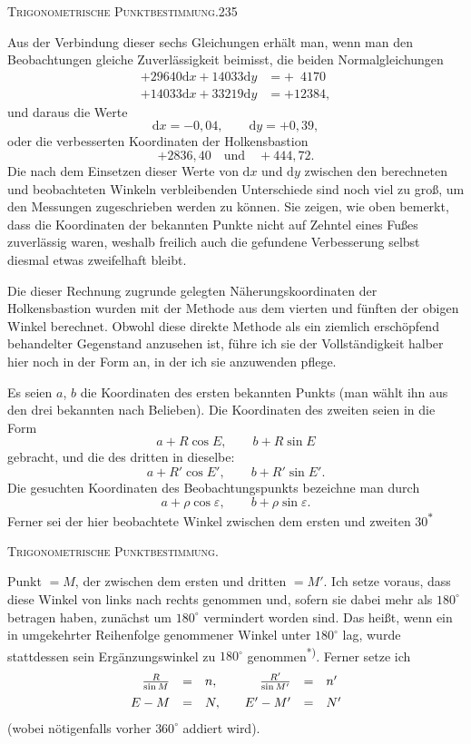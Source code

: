 \clearpage
\noindent\mbox{}\hfill\textsc{Trigonometrische Punktbestimmung.}\hfill235\par\medskip
Aus der Verbindung dieser sechs Gleichungen erhält man, wenn man den Beobachtungen gleiche Zuverlässigkeit beimisst, die beiden Normalgleichungen
\[
\begin{aligned}
+29640\mathrm dx+14033\mathrm dy&=+\phantom04170\\
+14033\mathrm dx+33219\mathrm dy&=+12384,
\end{aligned}
\]
und daraus die Werte
\[
\mathrm dx=-0{,}04,\qquad\mathrm dy=+0{,}39,
\]
oder die verbesserten Koordinaten der Holkensbastion
\[
+2836{,}40\quad\text{und}\quad+444{,}72.
\]
Die nach dem Einsetzen dieser Werte von $\mathrm dx$ und $\mathrm dy$ zwischen den berechneten und beobachteten Winkeln verbleibenden Unterschiede sind noch viel zu groß, um den Messungen zugeschrieben werden zu können. Sie zeigen, wie oben bemerkt, dass die Koordinaten der bekannten Punkte nicht auf Zehntel eines Fußes zuverlässig waren, weshalb freilich auch die gefundene Verbesserung selbst diesmal etwas zweifelhaft bleibt.

Die dieser Rechnung zugrunde gelegten Näherungskoordinaten der Holkensbastion wurden mit der  Methode aus dem vierten und fünften der obigen Winkel berechnet. Obwohl diese direkte Methode als ein ziemlich erschöpfend behandelter Gegenstand anzusehen ist, führe ich sie der Vollständigkeit halber hier noch in der Form an, in der ich sie anzuwenden pflege.

Es seien $a$, $b$ die Koordinaten des ersten bekannten Punkts (man wählt ihn aus den drei bekannten nach Belieben). Die Koordinaten des zweiten seien in die Form
\[
a+R\cos E,\qquad b+R\sin E
\]
gebracht, und die des dritten in dieselbe:
\[
a+R'\cos E',\qquad b+R'\sin E'.
\]
Die gesuchten Koordinaten des Beobachtungspunkts bezeichne man durch
\[
a+\rho\cos\varepsilon,\qquad b+\rho\sin\varepsilon.
\]
Ferner sei der hier beobachtete Winkel zwischen dem ersten und zweiten
\vfill\noindent\hfill30\textsuperscript{$\ast$}\hspace*{2cm}

\clearpage
{}\hfill\textsc{Trigonometrische Punktbestimmung.}\hfill\mbox{}\par\medskip
\noindent Punkt $=M$, der zwischen dem ersten und dritten $=M'$. Ich setze voraus, dass diese Winkel von links nach rechts genommen und, sofern sie dabei mehr als $180^\circ$ betragen haben, zunächst um $180^\circ$ vermindert worden sind. Das heißt, wenn ein in umgekehrter Reihenfolge genommener Winkel unter $180^\circ$ lag, wurde stattdessen sein Ergänzungswinkel zu $180^\circ$ genommen\textsuperscript{*)}. Ferner setze ich
\[
\begin{array}{rcl@{\qquad}rcl}
\frac R{\sin M}&=&n,&\frac{R'}{\sin M'}&=&n'\\[5pt]
E-M&=&N,&E'-M'&=&N'
\end{array}
\]
(wobei nötigenfalls vorher $360^\circ$ addiert wird).


